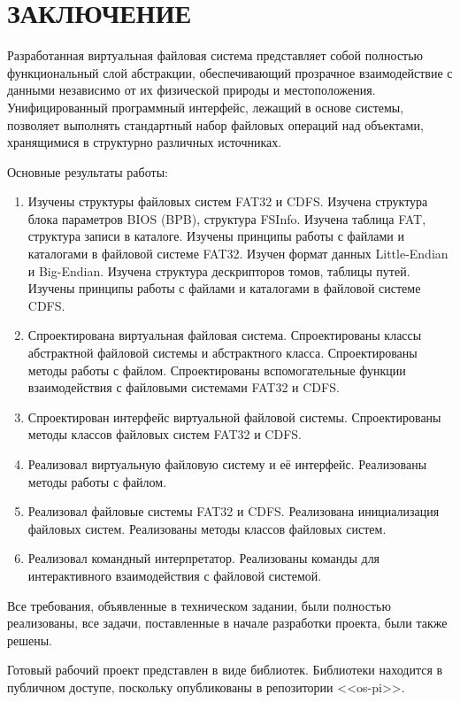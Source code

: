 \section*{ЗАКЛЮЧЕНИЕ}

Разработанная виртуальная файловая система представляет собой полностью функциональный слой абстракции, обеспечивающий прозрачное взаимодействие с данными независимо от их физической природы и местоположения. Унифицированный программный интерфейс, лежащий в основе системы, позволяет выполнять стандартный набор файловых операций над объектами, хранящимися в структурно различных источниках.

Основные результаты работы:

\begin{enumerate}
\item Изучены структуры файловых систем FAT32 и CDFS. Изучена структура блока параметров BIOS (BPB), структура FSInfo. Изучена таблица FAT, структура записи в каталоге. Изучены принципы работы с файлами и каталогами в файловой системе FAT32. Изучен формат данных Little-Endian и Big-Endian. Изучена структура дескрипторов томов, таблицы путей. Изучены принципы работы с файлами и каталогами в файловой системе CDFS.
\item Спроектирована виртуальная файловая система. Спроектированы классы абстрактной файловой системы и абстрактного класса. Спроектированы методы работы с файлом. Спроектированы вспомогательные функции взаимодействия с файловыми системами FAT32 и CDFS.
\item Спроектирован интерфейс виртуальной файловой системы. Спроектированы методы классов файловых систем FAT32 и CDFS.
\item Реализовал виртуальную файловую систему и её интерфейс. Реализованы методы работы с файлом.
\item Реализовал файловые системы FAT32 и CDFS. Реализована инициализация файловых систем. Реализованы методы классов файловых систем.
\item Реализовал командный интерпретатор. Реализованы команды для интерактивного взаимодействия с файловой системой.
\end{enumerate}

Все требования, объявленные в техническом задании, были полностью реализованы, все задачи, поставленные в начале разработки проекта, были также решены.

Готовый рабочий проект представлен в виде библиотек. Библиотеки находится в публичном доступе, поскольку опубликованы в репозитории <<os-pi>>.  
